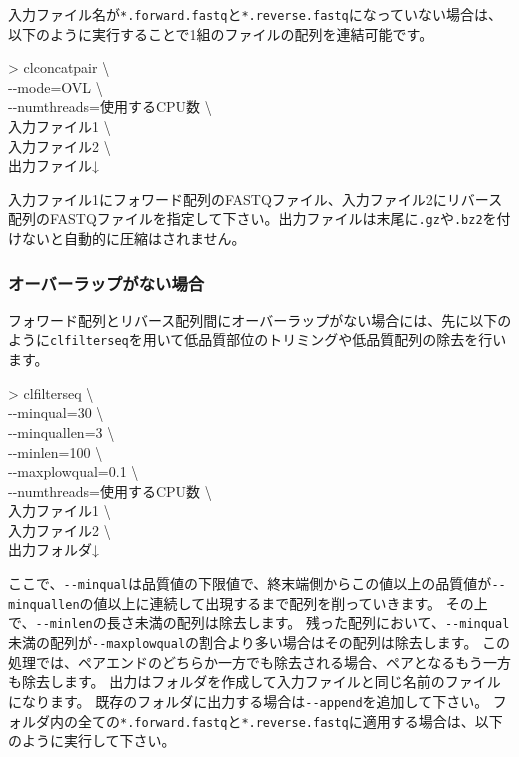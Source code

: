 \documentclass[titlepage,10pt,a4paper]{jsbook}
\newenvironment{cmd}{\begin{oframed}\raggedright\ttfamily\footnotesize\setlength{\baselineskip}{1.4em}}{\end{oframed}\vspace{-1em}}
\begin{document}
入力ファイル名が\texttt{*.forward.fastq}と\texttt{*.reverse.fastq}になっていない場合は、以下のように実行することで1組のファイルの配列を連結可能です。

\begin{cmd}
{\textgreater} clconcatpair {\textbackslash}\\
{-}{-}mode=OVL {\textbackslash}\\
{-}{-}numthreads=使用するCPU数 {\textbackslash}\\
入力ファイル1 {\textbackslash}\\
入力ファイル2 {\textbackslash}\\
出力ファイル↓
\end{cmd}

入力ファイル1にフォワード配列のFASTQファイル、入力ファイル2にリバース配列のFASTQファイルを指定して下さい。出力ファイルは末尾に\texttt{.gz}や\texttt{.bz2}を付けないと自動的に圧縮はされません。

\subsubsection{オーバーラップがない場合}

フォワード配列とリバース配列間にオーバーラップがない場合には、先に以下のように\texttt{clfilterseq}を用いて低品質部位のトリミングや低品質配列の除去を行います。

\begin{cmd}
{\textgreater} clfilterseq {\textbackslash}\\
{-}{-}minqual=30 {\textbackslash}\\
{-}{-}minquallen=3 {\textbackslash}\\
{-}{-}minlen=100 {\textbackslash}\\
{-}{-}maxplowqual=0.1 {\textbackslash}\\
{-}{-}numthreads=使用するCPU数 {\textbackslash}\\
入力ファイル1 {\textbackslash}\\
入力ファイル2 {\textbackslash}\\
出力フォルダ↓
\end{cmd}

ここで、\texttt{{-}{-}minqual}は品質値の下限値で、終末端側からこの値以上の品質値が\texttt{{-}{-}minquallen}の値以上に連続して出現するまで配列を削っていきます。
その上で、\texttt{{-}{-}minlen}の長さ未満の配列は除去します。
残った配列において、\texttt{{-}{-}minqual}未満の配列が\texttt{{-}{-}maxplowqual}の割合より多い場合はその配列は除去します。
この処理では、ペアエンドのどちらか一方でも除去される場合、ペアとなるもう一方も除去します。
出力はフォルダを作成して入力ファイルと同じ名前のファイルになります。
既存のフォルダに出力する場合は\texttt{{-}{-}append}を追加して下さい。
フォルダ内の全ての\texttt{*.forward.fastq}と\texttt{*.reverse.fastq}に適用する場合は、以下のように実行して下さい。
\end{document}
